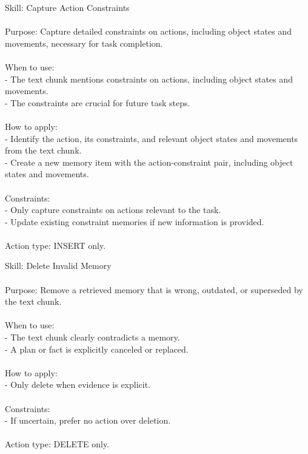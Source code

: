 \begin{center}
\begin{tcolorbox}[
  title={Evolved Skill on ALFWorld - CAPTURE\_ACTION\_CONSTRAINTS},
  colback=orange!6,
  colframe=orange!75!black,
  coltitle=black
]
{
Skill: Capture Action Constraints \\\\
Purpose: Capture detailed constraints on actions, including object states and movements, necessary for task completion. \\\\
When to use: \\
- The text chunk mentions constraints on actions, including object states and movements. \\
- The constraints are crucial for future task steps. \\\\
How to apply: \\
- Identify the action, its constraints, and relevant object states and movements from the text chunk. \\
- Create a new memory item with the action-constraint pair, including object states and movements. \\\\
Constraints: \\
- Only capture constraints on actions relevant to the task. \\
- Update existing constraint memories if new information is provided. \\\\
Action type: INSERT only.
}
\label{appendix:case_capture_action_constraints}
\end{tcolorbox}
\end{center}

\begin{center}
\begin{tcolorbox}[
  title={Evolved Skill on ALFWorld - DELETE},
  colback=orange!6,
  colframe=orange!75!black,
  coltitle=black
]
{
Skill: Delete Invalid Memory \\\\
Purpose: Remove a retrieved memory that is wrong, outdated, or superseded by the text chunk. \\\\
When to use: \\
- The text chunk clearly contradicts a memory. \\
- A plan or fact is explicitly canceled or replaced. \\\\
How to apply: \\
- Only delete when evidence is explicit. \\\\
Constraints: \\
- If uncertain, prefer no action over deletion. \\\\
Action type: DELETE only.
}
\label{appendix:case_delete}
\end{tcolorbox}
\end{center}

